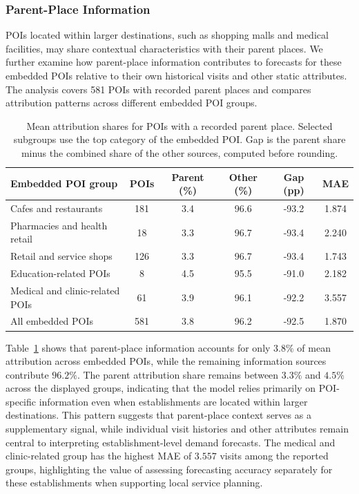 \documentclass[preprint,authoryear,11pt]{elsarticle}
\theoremstyle{definition}
\begin{document}
\subsubsection{Parent-Place Information}
\label{subsubsec:parent_results}

POIs located within larger destinations, such as shopping malls and medical facilities, may share contextual characteristics with their parent places.
We further examine how parent-place information contributes to forecasts for these embedded POIs relative to their own historical visits and other static attributes.
The analysis covers 581 POIs with recorded parent places and compares attribution patterns across different embedded POI groups.


\begin{table}[!htbp]
\centering
\fontsize{9pt}{11pt}\selectfont
\caption{Mean attribution shares for POIs with a recorded parent place. Selected subgroups use the top category of the embedded POI. Gap is the parent share minus the combined share of the other sources, computed before rounding.}
\label{tab_parent}
\begingroup
\setlength{\tabcolsep}{4pt}
\renewcommand{\arraystretch}{1.12}
\begin{tabular*}{\linewidth}{@{\extracolsep{\fill}}lccccc@{}}
\toprule
Embedded POI group
& POIs
& Parent (\%)
& Other (\%)
& Gap (pp)
& MAE \\
\midrule
Cafes and restaurants
& 181 & 3.4 & 96.6 & -93.2 & 1.874 \\
Pharmacies and health retail
& 18 & 3.3 & 96.7 & -93.4 & 2.240 \\
Retail and service shops
& 126 & 3.3 & 96.7 & -93.4 & 1.743 \\
Education-related POIs
& 8 & 4.5 & 95.5 & -91.0 & 2.182 \\
Medical and clinic-related POIs
& 61 & 3.9 & 96.1 & -92.2 & 3.557 \\
\midrule
All embedded POIs
& 581 & 3.8 & 96.2 & -92.5 & 1.870 \\
\bottomrule
\end{tabular*}
\endgroup
\end{table}

Table~\ref{tab_parent} shows that parent-place information accounts for only \(3.8\%\) of mean attribution across embedded POIs, while the remaining information sources contribute \(96.2\%\).
The parent attribution share remains between \(3.3\%\) and \(4.5\%\) across the displayed groups, indicating that the model relies primarily on POI-specific information even when establishments are located within larger destinations.
This pattern suggests that parent-place context serves as a supplementary signal, while individual visit histories and other attributes remain central to interpreting establishment-level demand forecasts.
The medical and clinic-related group has the highest MAE of \(3.557\) visits among the reported groups, highlighting the value of assessing forecasting accuracy separately for these establishments when supporting local service planning.
\end{document}
